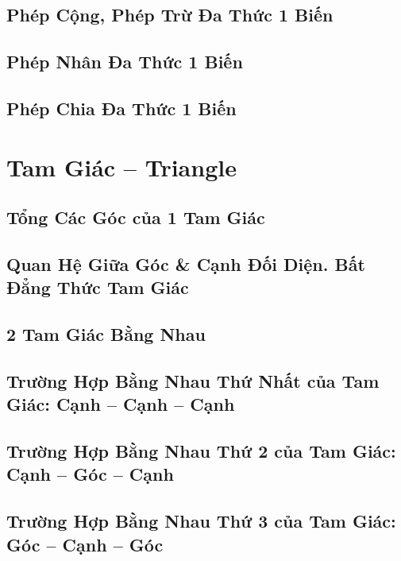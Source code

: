 \documentclass[oneside]{book}
\numberwithin{equation}{section}
\begin{document}
\section{Phép Cộng, Phép Trừ Đa Thức 1 Biến}

\section{Phép Nhân Đa Thức 1 Biến}

\section{Phép Chia Đa Thức 1 Biến}


\chapter{Tam Giác -- Triangle}

\section{Tổng Các Góc của 1 Tam Giác}

\section{Quan Hệ Giữa Góc \& Cạnh Đối Diện. Bất Đẳng Thức Tam Giác}

\section{2 Tam Giác Bằng Nhau}

\section{Trường Hợp Bằng Nhau Thứ Nhất của Tam Giác: Cạnh -- Cạnh -- Cạnh}

\section{Trường Hợp Bằng Nhau Thứ 2 của Tam Giác: Cạnh -- Góc -- Cạnh}

\section{Trường Hợp Bằng Nhau Thứ 3 của Tam Giác: Góc -- Cạnh -- Góc}
\end{document}
